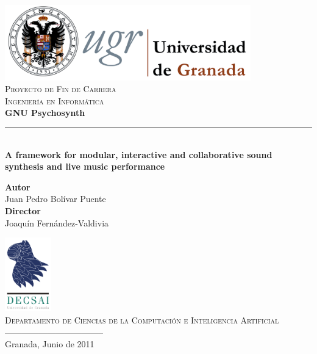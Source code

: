 
\begin{titlepage}
  \thispagestyle{empty}


  \centering
  \includegraphics[width=0.8\textwidth]{pic/logo-ugr.png}\\[1cm]

  \textsc{\Large Proyecto de Fin de Carrera\\%
  }
  \textsc{Ingeniería en Informática}\\[1cm]
  
  {\Huge\bfseries\sffamily GNU Psychosynth}
  \noindent\rule[-1ex]{\textwidth}{3pt}\\[2.5ex]
  {\large\bfseries 
    A framework for modular, interactive and collaborative sound
    synthesis and live music performance}

  \vspace{1cm}

  \begin{center}
    \textbf{Autor}\\ {Juan Pedro Bolívar Puente}\\[.5cm]
    \textbf{Director}\\
    {Joaquín Fernández-Valdivia}\\[0.5cm]

  \end{center}

  \vfill

  \begin{center}\small

    \includegraphics[width=0.15\textwidth]{pic/logo-decsai.png}\\%
    \textsc{Departamento de Ciencias de la Computación e Inteligencia Artificial}\\
    \textsc{-----------------------------------}\\
    Granada, Junio de 2011
  \end{center}


\end{titlepage}

